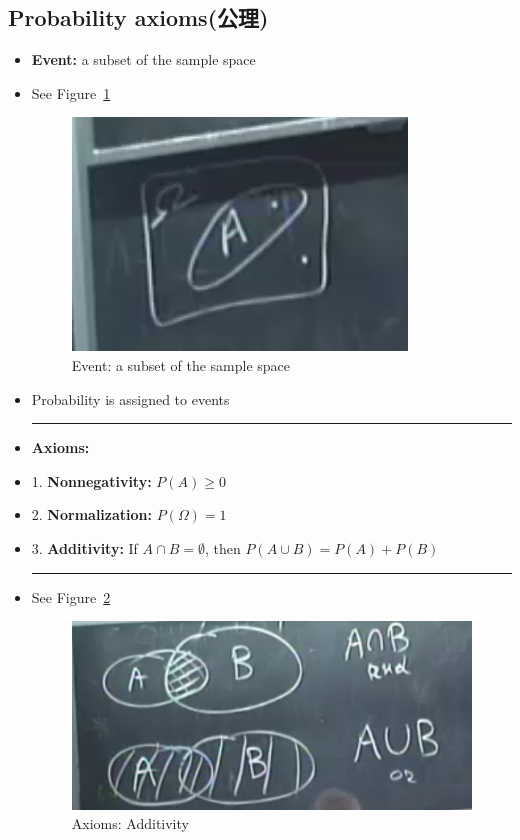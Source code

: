     \subsection{Probability axioms(公理)}
    \begin{itemize}
        \item \textbf{Event:} a subset of the sample space
        \item See Figure~\ref{fig:1-3}
		 
        \begin{figure}[h!] %
       \centering
        \includegraphics[scale=0.7]{images/1-3}
       \caption{Event: a subset of the sample space}
        \label{fig:1-3}
        \end{figure}

        \item Probability is assigned to events
        
        \rule{\textwidth}{1pt} %
        \item \textbf{Axioms:}
        \item 1. \textbf{Nonnegativity:} $P(A) \geq 0$
        \item 2. \textbf{Normalization:} $P(\Omega) = 1$
        \item 3. \textbf{Additivity:} If $A \cap B = \emptyset$, then $P(A \cup B) = P(A)+ P(B)$
        \rule{\textwidth}{1pt} %

        \item See Figure~\ref{fig:1-4}
		 
        \begin{figure}[h!] %
       \centering
        \includegraphics[scale=0.7]{images/1-4}
       \caption{Axioms: Additivity}
        \label{fig:1-4}
        \end{figure}
            

\end{itemize}

